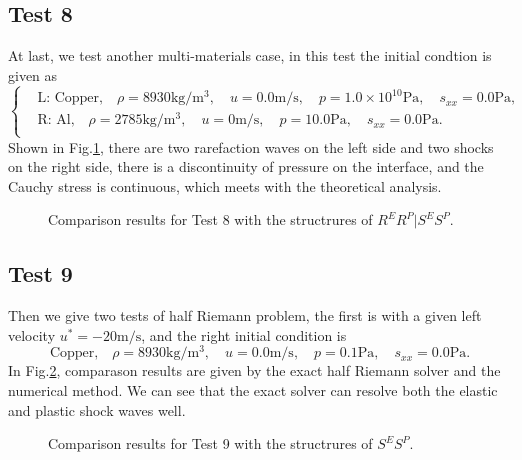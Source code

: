 \documentclass{article}
\numberwithin{equation}{section}
\numberwithin{table}{section}
\begin{document}
\subsection{Test 8}
At last, we test another multi-materials case, in this test the initial condtion is given as
\begin{equation}
 \left\{ \begin{aligned}
	 &	 \text{L: Copper,}\quad  \rho = 8930 \text{kg}/\text{m}^3, \quad  u = 0.0\text{m}/\text{s}, \quad  p = 1.0\times 10^{10}\text{Pa}, \quad  s_{xx}=0.0 \text{Pa},\\
	 &	 \text{R: Al,}\quad  \rho = 2785 \text{kg}/\text{m}^3, \quad  u = 0\text{m}/\text{s}, \quad  p = 10.0 \text{Pa}, \quad  s_{xx}=0.0 \text{Pa}.\\
   \end{aligned}
 \right.
\end{equation}
Shown in Fig.\ref{fig:case8}, there are two rarefaction waves on the left side and two shocks on the right side, there is a discontinuity of pressure on the interface, and the Cauchy stress is continuous, which  meets with the theoretical analysis.
\begin{figure}
  \centering

    \caption{Comparison results for Test 8 with the structrures of $R^ER^P|S^ES^P$.  }
  \label{fig:case8}
\end{figure}
\subsection{Test 9}
Then we give two tests of  half Riemann problem, the first is with a given left velocity $u^* = -20\text{m/s}$, and the right initial condition is
\begin{equation}
 \text{Copper,}\quad\rho = 8930\text{kg}/\text{m}^3, \quad  u = 0.0\text{m}/\text{s}, \quad  p =0.1\text{Pa}, \quad  s_{xx}=0.0\text{Pa}.
\end{equation}
In Fig.\ref{fig:case9}, comparason results are given by the exact half Riemann solver and the numerical method. We can see that the exact solver  can resolve both the elastic and plastic shock waves well.
\begin{figure}
  \centering

    \caption{Comparison results for Test 9 with the structrures of $S^ES^P$.  }
  \label{fig:case9}
\end{figure}
\end{document}

